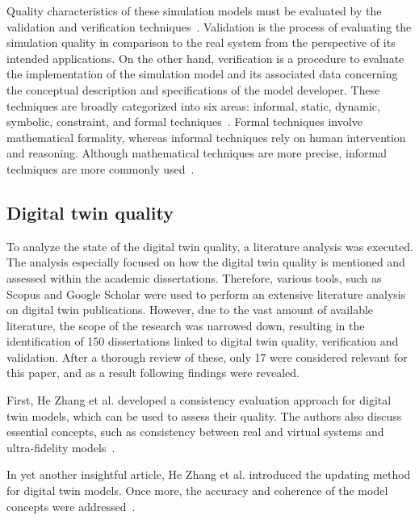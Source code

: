 \documentclass{llncs}
\begin{document}
    Quality characteristics of these simulation models must be evaluated by the validation and verification techniques~\cite{StewartSimulation,VerificationValidationSergent,OsmanBalci}. 
    Validation is the process of evaluating the simulation quality in comparison to the real system from the perspective of its intended applications.
     On the other hand, verification is a procedure to evaluate the implementation of the simulation model and 
    its associated data concerning the conceptual description and specifications of the model developer\cite{StewartSimulation,VerificationValidationSergent}. 
    These techniques are broadly categorized into six areas: informal, static, dynamic, 
    symbolic, constraint, and formal techniques~\cite{balcicategories,balcitechniques}. Formal techniques involve mathematical formality, whereas informal techniques rely on 
    human intervention and reasoning. Although mathematical techniques are more precise, informal techniques are more commonly used~\cite{balcicategories}. 

    \subsection{Digital twin quality}
    To analyze the state of the digital twin quality, a literature analysis was executed. 
    The analysis especially focused on how the digital twin quality is mentioned and assessed within the academic dissertations. Therefore, various tools, such as Scopus and Google Scholar were 
    used to perform an extensive literature analysis on digital twin publications. However, due to the vast amount of available literature, the scope of the research was narrowed down, resulting in the identification of 
    150 dissertations linked to digital twin quality, verification and validation. After a thorough review of these, only 17 were considered relevant for this paper, and as a result following findings were revealed.
  
    First, He Zhang et al. developed a consistency evaluation approach for digital twin models, which can be used to assess their quality. 
    The authors also discuss essential concepts, such as consistency between real and virtual systems and ultra-fidelity models~\cite{ZHANGEVALUATIONMETHOD}. 

    In yet another insightful article, He Zhang et al. introduced the updating method for digital twin models.
    Once more, the accuracy and coherence of the model concepts were addressed~\cite{ZHANGUPDATEMETHOD}.
\end{document}
